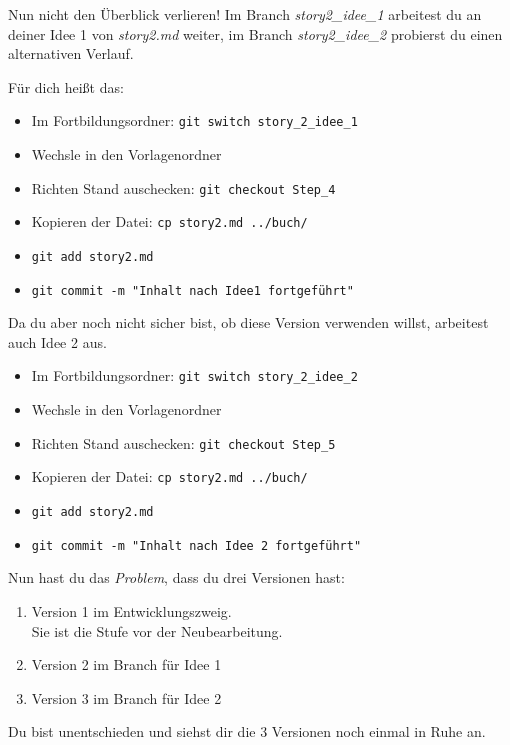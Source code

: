 \documentclass[
  letterpaper,
  DIV=11]{scrreprt}
\providecommand{\tightlist}{%
  \setlength{\itemsep}{0pt}\setlength{\parskip}{0pt}}\usepackage{longtable,booktabs,array}
\newcommand{\datei}[1]{\textit{#1}\xspace}
\newcommand{\branch}[1]{\textit{#1}\xspace}
\begin{document}
Nun nicht den Überblick verlieren! Im Branch \branch{story2\_idee\_1}
arbeitest du an deiner Idee 1 von \datei{story2.md} weiter, im Branch
\branch{story2\_idee\_2} probierst du einen alternativen Verlauf.

Für dich heißt das:

\begin{itemize}
\tightlist
\item
  Im Fortbildungsordner: \texttt{git\ switch\ story\_2\_idee\_1}
\item
  Wechsle in den Vorlagenordner
\item
  Richten Stand auschecken: \texttt{git\ checkout\ Step\_4}
\item
  Kopieren der Datei: \texttt{cp\ story2.md\ ../buch/}
\item
  \texttt{git\ add\ story2.md}
\item
  \texttt{git\ commit\ -m\ "Inhalt\ nach\ Idee1\ fortgeführt"}
\end{itemize}

Da du aber noch nicht sicher bist, ob diese Version verwenden willst,
arbeitest auch Idee 2 aus.

\begin{itemize}
\tightlist
\item
  Im Fortbildungsordner: \texttt{git\ switch\ story\_2\_idee\_2}
\item
  Wechsle in den Vorlagenordner
\item
  Richten Stand auschecken: \texttt{git\ checkout\ Step\_5}
\item
  Kopieren der Datei: \texttt{cp\ story2.md\ ../buch/}
\item
  \texttt{git\ add\ story2.md}
\item
  \texttt{git\ commit\ -m\ "Inhalt\ nach\ Idee\ 2\ fortgeführt"}
\end{itemize}

Nun hast du das \emph{Problem}, dass du drei Versionen hast:

\begin{enumerate}
\def\labelenumi{\arabic{enumi}.}
\tightlist
\item
  Version 1 im Entwicklungszweig.\\
  Sie ist die Stufe vor der Neubearbeitung.
\item
  Version 2 im Branch für Idee 1
\item
  Version 3 im Branch für Idee 2
\end{enumerate}

Du bist unentschieden und siehst dir die 3 Versionen noch einmal in Ruhe
an.
\end{document}
